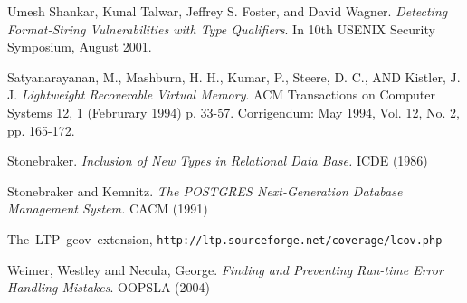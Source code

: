 \documentclass[10pt,letterpaper,twocolumn,english]{article}
\newcommand{\rcs}[1]{\textcolor{green}{\bf RCS: #1}}
\begin{document}
\begin{thebibliography}{99}
\begin{small}
 Umesh Shankar, Kunal Talwar, Jeffrey S. Foster, and David Wagner. {\em Detecting Format-String Vulnerabilities with Type Qualifiers}. In 10th USENIX Security Symposium, August 2001.

 Satyanarayanan, M., Mashburn, H. H., Kumar, P., Steere, D. C., AND Kistler, J. J. {\em Lightweight Recoverable Virtual Memory}. ACM Transactions on Computer Systems 12, 1 (Februrary 1994) p. 33-57. Corrigendum: May 1994, Vol. 12, No. 2, pp. 165-172.

 Stonebraker. {\em Inclusion of New Types in Relational Data Base. } ICDE (1986) %

 Stonebraker and Kemnitz. {\em The POSTGRES Next-Generation Database Management System. } CACM (1991)

 The~LTP~gcov~extension, {\tt http://ltp.sourceforge.net/coverage/lcov.php }

 Weimer, Westley and Necula, George. {\em Finding and Preventing Run-time Error Handling Mistakes}. OOPSLA (2004)


%
%
%
%
%
%
%
\end{small}
\end{thebibliography}
\end{document}
